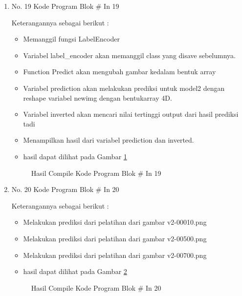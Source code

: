 \begin{enumerate}
\item No. 19 Kode Program Blok \# In 19
\par 
Keterangannya sebagai berikut :
\begin{itemize}
\item Memanggil fungsi LabelEncoder
\item Variabel label\_encoder akan memanggil class yang disave sebelumnya.
\item Function Predict akan mengubah gambar kedalam bentuk array
\item Variabel prediction akan melakukan prediksi untuk model2 dengan reshape variabel newimg dengan bentukarray 4D.
\item Variabel inverted akan mencari nilai tertinggi output dari hasil prediksi tadi
\item Menampilkan hasil dari variabel prediction dan inverted.
\item hasil dapat dilihat pada Gambar \ref{refer30}
\end{itemize}

\begin{figure}[!htbp]
      \caption{Hasil Compile Kode Program Blok \# In 19}
      \label{refer30}
\end{figure}

\item No. 20 Kode Program Blok \# In 20
\par 
Keterangannya sebagai berikut :
\begin{itemize}
\item Melakukan prediksi dari pelatihan dari gambar v2-00010.png
\item Melakukan prediksi dari pelatihan dari gambar v2-00500.png
\item Melakukan prediksi dari pelatihan dari gambar v2-00700.png
\item hasil dapat dilihat pada Gambar \ref{refer31}
\end{itemize}

\begin{figure}[!htbp]
      \caption{Hasil Compile Kode Program Blok \# In 20}
      \label{refer31}
\end{figure}

\end{enumerate}